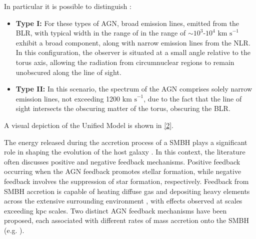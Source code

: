 In particular it is possible to distinguish :
 
\begin{itemize}
  \item \textbf{Type I:} For these types of AGN, broad emission lines, emitted from the BLR, with typical width in the range of in the range of $\sim 10^{3}$-$10^{4}$ $\text{km s}^{-1}$ exhibit a broad component,  along with narrow emission lines from the NLR. In this configuration, the observer is situated at a small angle relative to the torus axis, allowing the radiation from circumnuclear regions to remain unobscured along the line of sight.
  
  \item \textbf{Type II:} In this scenario, the spectrum of the AGN comprises solely narrow emission lines, not exceeding 1200 $  \text{km s}^{-1}$, due to the fact that the line of sight intersects the obscuring matter of the torus, obscuring the BLR.
  
\end{itemize}
A visual depiction of the Unified Model is shown in \autoref{2}.

The energy released during the accretion process of a SMBH plays a significant role in shaping the evolution of the host galaxy \cite{2021A&A...646A.167M}. In this context, the literature often discusses positive and negative feedback mechanisms.
Positive feedback occurring when the AGN feedback promotes stellar formation, while negative feedback involves the suppression of star formation, respectively. Feedback from SMBH accretion is capable of heating diffuse gas \cite{2005Natur.433..604D} and depositing heavy elements across the extensive surrounding environment \cite{2000ApJ...539L..13G}, with effects observed at scales exceeding kpc scales. Two distinct AGN feedback mechanisms have been proposed, each associated with different rates of mass accretion onto the SMBH (e.g. \cite{2012ARA&A..50..455F, 2017NatAs...1E.165H}).

